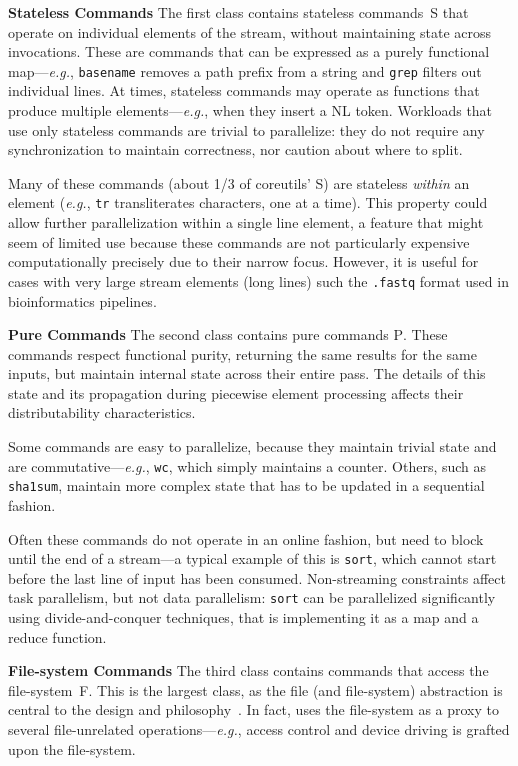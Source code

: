 \documentclass[sigplan,10pt,review,anonymous]{acmart}
\newcommand{\eg}{{\em e.g.}, }
\newcommand{\heading}[1]{\vspace{4pt}\noindent\textbf{#1}\enspace}
\newcommand{\ttt}[1]{\texttt{\small #1}}
\newcommand{\cn}[1]{\mbox{\textcircled{\footnotesize #1}}}
\newcommand{\pur}{\cn{\textsc{P}}\xspace}
\newcommand{\sta}{\cn{\textsc{S}}\xspace}
\newcommand{\dfs}{\cn{\textsc{F}}\xspace}
\begin{document}

\heading{Stateless Commands}
The first class contains stateless commands~\sta that operate on individual elements of the stream, without maintaining state across invocations.
These are commands that can be expressed as a purely functional map---\eg \ttt{basename} removes a path prefix from a string and \ttt{grep} filters out individual lines.
At times, stateless commands may operate as functions that produce multiple elements---\eg when they insert a {\sc NL} token.
Workloads that use only stateless commands are trivial to parallelize:
  they do not require any synchronization to maintain correctness, nor caution about where to split.

Many of these commands (about 1/3 of coreutils' \sta) are stateless \emph{within} an element (\eg \ttt{tr} transliterates characters, one at a time).
This property could allow further parallelization within a single line element, a feature that might seem of limited use because these commands are not particularly expensive computationally precisely due to their narrow focus.
However, it is useful for cases with very large stream elements (long lines) such the \ttt{.fastq} format used in bioinformatics pipelines.

\heading{Pure Commands}
The second class contains pure commands \pur.
These commands respect functional purity, returning the same results for the same inputs, but maintain internal state across their entire pass.
The details of this state and its propagation during piecewise element processing affects their distributability characteristics.

Some commands are easy to parallelize, because they maintain trivial state and are commutative---\eg \ttt{wc}, which simply maintains a counter.
Others, such as \ttt{sha1sum}, maintain more complex state that has to be updated in a sequential fashion.

Often these commands do not operate in an online fashion, but need to block until the end of a stream---a typical example of this is \ttt{sort}, which cannot start before the last line of input has been consumed.
Non-streaming constraints affect task parallelism, but not data parallelism:
  \ttt{sort} can be parallelized significantly using divide-and-conquer techniques, that is implementing it as a map and a reduce function.

\heading{File-system Commands}
The third class contains commands that access the file-system~\dfs.
This is the largest class, as the file (and file-system) abstraction is central to the \unix design and philosophy~\cite{unix}.
In fact, \unix uses the file-system as a proxy to several file-unrelated operations---\eg access control and device driving is grafted upon the file-system.
\end{document}
